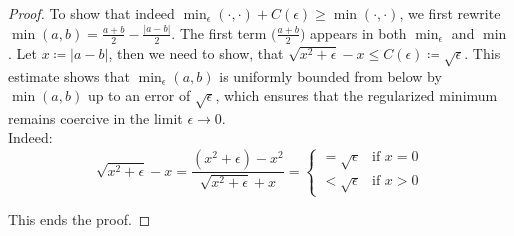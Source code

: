 \documentclass[12pt,openany]{book}
\theoremstyle{plainnormal}
\theoremstyle{remark}
\begin{document}
\begin{proof}
To show that indeed $\min_\epsilon(\cdot, \cdot) + C(\epsilon) \geq \min(\cdot, \cdot)$, we first rewrite $\min(a,b) = \frac{a+b}{2} - \frac{|a-b|}{2}$. The first term $\big(\frac{a+b}{2}\big)$ appears in both $\min_\epsilon$ and $\min$. Let $x \coloneqq |a-b|$, then we need to show, that $\sqrt{x^2 + \epsilon } -x \leq C(\epsilon) \coloneqq \sqrt{\epsilon}$. This estimate shows that \(\min_\epsilon(a, b)\) is uniformly bounded from below by \(\min(a, b)\) up to an error of \(\sqrt{\epsilon}\), 
which ensures that the regularized minimum remains coercive in the limit \(\epsilon \to 0\). \\
Indeed: $$\sqrt{x^2 + \epsilon } -x = \frac{(x^2+\epsilon) - x^2}{\sqrt{x^2+\epsilon} + x} = 
\begin{cases}
= \sqrt{\epsilon} & \text{if } x = 0 \\
< \sqrt{\epsilon} & \text{if } x > 0
\end{cases}$$

This ends the proof.
\end{proof}
\clearpage
\end{document}
